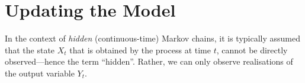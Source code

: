 \documentclass[twoside,11pt]{article}
\newcommand{\reals}{\mathbb{R}}
\newcommand{\states}{\mathcal{X}}
\newcommand{\observs}{\mathcal{Y}}
\newcommand{\lexp}{\underline{\mathbb{E}}_{\rateset,\mathcal{M}}}
\newcommand{\gambles}{\mathcal{L}}
\newcommand{\ind}[1]{\mathbb{I}_{#1}}
\newcommand{\rateset}{\mathcal{Q}}
\begin{document}



\section{Updating the Model}\label{sec:updating_model}

In the context of \emph{hidden} (continuous-time) Markov chains, it is typically assumed that the state $X_t$ that is obtained by the process at time $t$, cannot be directly observed---hence the term ``hidden''. Rather, we can only observe realisations of the output variable $Y_t$. %
\end{document}
